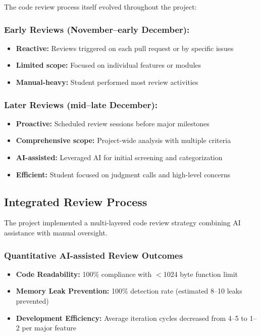 \documentclass[12pt,a4paper]{article}
\begin{document}
The code review process itself evolved throughout the project:

\subsubsection*{Early Reviews (November--early December):}
\begin{itemize}
    \item \textbf{Reactive:} Reviews triggered on each pull request or by specific issues
    \item \textbf{Limited scope:} Focused on individual features or modules
    \item \textbf{Manual-heavy:} Student performed most review activities
\end{itemize}

\subsubsection*{Later Reviews (mid--late December):}
\begin{itemize}
    \item \textbf{Proactive:} Scheduled review sessions before major milestones
    \item \textbf{Comprehensive scope:} Project-wide analysis with multiple criteria
    \item \textbf{AI-assisted:} Leveraged AI for initial screening and categorization
    \item \textbf{Efficient:} Student focused on judgment calls and high-level concerns
\end{itemize}

\subsection{Integrated Review Process}

The project implemented a multi-layered code review strategy combining AI assistance with manual oversight.

\subsubsection*{Quantitative AI-assisted Review Outcomes}
\begin{itemize}
    \item \textbf{Code Readability:} 100\% compliance with $<$1024 byte function limit
    \item \textbf{Memory Leak Prevention:} 100\% detection rate (estimated 8--10 leaks prevented)
    \item \textbf{Development Efficiency:} Average iteration cycles decreased from 4--5 to 1--2 per major feature
\end{itemize}
\end{document}
